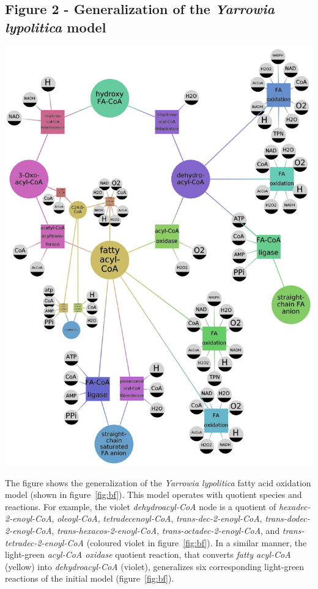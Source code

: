 \documentclass[10pt]{bmc_article}
\newenvironment{bmcformat}{\baselineskip20pt\sloppy\setboolean{publ}{false}}{\baselineskip20pt\sloppy}
\begin{document}
\begin{bmcformat}
\subsection*{Figure 2 - Generalization of the \textit{Yarrowia lypolitica} model}  
\includegraphics[scale=0.17]{pics/yali_after.png} 

      The figure shows the generalization of the \textit{Yarrowia lypolitica} fatty acid oxidation model (shown in figure~\ref{fig:bf}). This model operates with quotient species and reactions. For example, the violet \textit{dehydroacyl-CoA} node is a quotient of \textit{hexadec-2-enoyl-CoA}, \textit{oleoyl-CoA}, \textit{tetradecenoyl-CoA}, \textit{trans-dec-2-enoyl-CoA}, \textit{trans-dodec-2-enoyl-CoA}, \textit{trans-hexacos-2-enoyl-CoA}, \textit{trans-octadec-2-enoyl-CoA}, and \textit{trans-tetradec-2-enoyl-CoA} (coloured violet in figure~\ref{fig:bf}). In a similar manner, the light-green \textit{acyl-CoA oxidase} quotient reaction, that converts \textit{fatty acyl-CoA} (yellow) into \textit{dehydroacyl-CoA} (violet), generalizes six corresponding light-green reactions of the initial model (figure~\ref{fig:bf}).
      

\end{bmcformat}
\end{document}
